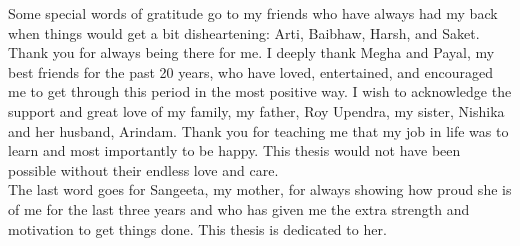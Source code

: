 \documentclass[
11pt, %
oneside, %
english, %
onehalfspacing, %
nolistspacing, %
liststotoc, %
headsepline, %
consistentlayout, %
]{name} %
\begin{document}
\begin{acknowledgements}
Some special words of gratitude go to my friends who have always had my back when things would get a bit disheartening: Arti, Baibhaw, Harsh, and Saket. Thank you for always being there for me. I deeply thank Megha and Payal, my best friends for the past 20 years, who have loved, entertained, and encouraged me to get through this period in the most positive way.
I wish to acknowledge the support and great love of my family, my father, Roy Upendra, my sister, Nishika and her husband, Arindam. Thank you for teaching me that my job in life was to learn and most importantly to be happy. This thesis would not have been possible without their endless love and care.\\
The last word goes for Sangeeta, my mother, for always showing how proud she is of me for the last three years and who has given me the extra strength and motivation to get things done. This thesis is dedicated to her.

\end{acknowledgements}

\tableofcontents %
\listoffigures %
\listoftables %




\end{document}
